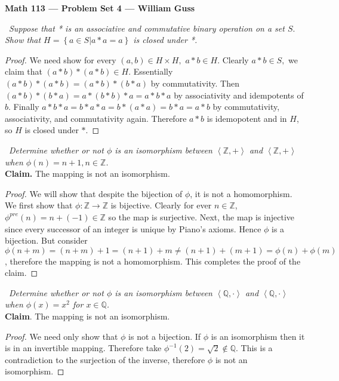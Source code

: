\documentclass[11pt]{amsart}
\def\integers{{\mathbb Z}}
\def\rationals{{\mathbb Q}}
\newcommand{\set}[1]{ \left\{ #1 \right\} }
\newcommand{\group}[2]{\left\langle #1, #2\right\rangle}
\begin{document}
\begin{center}{\bf Math 113 --- Problem Set 4 --- William Guss} \end{center}


\bigskip


\medskip {}\ \emph{Suppose that * is an associative and commutative binary operation on a set $S.$ 
Show that $H = \set{a \in S\mathrel{}|\mathrel{} a*a = a}$ is closed under *.}
\begin{proof}
	We need show for every $(a,b) \in H \times H,$ $a*b \in H$. Clearly $a*b \in S,$ we claim that $(a*b)*(a*b) \in H$. 
	Essentially $(a*b)*(a*b) = (a*b)*(b*a)$ by commutativity. Then $(a*b)*(b*a) = a*(b*b)*a = a*b*a$ by associativity and idempotents of $b$. Finally $a*b*a = b*a*a = b*(a*a) = b*a = a*b$ by commutativity, associativity, and commutativity again. Therefore $a*b$ is idemopotent and in $H$, so $H$ is closed under $*$.
\end{proof}

\medskip {}\ \emph{Determine whether or not $\phi$ is an isomorphism between $\group{\integers}{+}$ and $\group{\integers}{+}$ when $\phi(n) = n+1, n \in \integers$.}\\
\textbf{Claim.} The mapping is not an isomorphism.
\begin{proof}
	We will show that despite the bijection of $\phi$, it is not a homomorphism.
	We first show that $\phi:\integers \to \integers$ is bijective. Clearly for ever $n \in \integers$, $\phi^{pre}(n) = n+ (-1) \in \integers$ so the map is surjective. Next, the map is injective since every successor of an integer is unique by Piano's axioms. Hence $\phi$ is a bijection. But consider $\phi(n +m) = (n+m) + 1 = (n+ 1) + m \neq (n+1) + (m+1) =  \phi(n) + \phi(m)$, therefore the mapping is not a homomorphism. This completes the proof of the claim.
\end{proof}

\medskip {}\ \emph{Determine whether or not $\phi$ is an isomorphism between $\group{\rationals}{\cdot}$ and $\group{\rationals}{\cdot}$ when $\phi(x) = x^2$ for $x \in \rationals$.}\\
\textbf{Claim}. The mapping is not an isomorphism.
\begin{proof}
	We need only show that $\phi$ is not a bijection. If $\phi$ is an isomorphism then it is in an invertible mapping. Therefore take $\phi^{-1}(2) = \sqrt{2} \notin \rationals$. This is a contradiction to the surjection of the inverse, therefore $\phi$ is not an isomorphism.
\end{proof}
\end{document}
